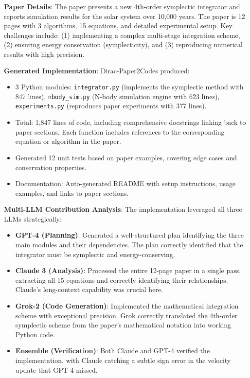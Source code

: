 \documentclass{ieeeaccess}
\begin{document}
\textbf{Paper Details}: The paper presents a new 4th-order symplectic integrator and reports simulation results for the solar system over 10,000 years. The paper is 12 pages with 3 algorithms, 15 equations, and detailed experimental setup. Key challenges include: (1) implementing a complex multi-stage integration scheme, (2) ensuring energy conservation (symplecticity), and (3) reproducing numerical results with high precision.

\textbf{Generated Implementation}: Dirac-Paper2Codes produced:
\begin{itemize}
    \item 3 Python modules: \texttt{integrator.py} (implements the symplectic method with 847 lines), \texttt{nbody\_sim.py} (N-body simulation engine with 623 lines), \texttt{experiments.py} (reproduces paper experiments with 377 lines).
    \item Total: 1,847 lines of code, including comprehensive docstrings linking back to paper sections. Each function includes references to the corresponding equation or algorithm in the paper.
    \item Generated 12 unit tests based on paper examples, covering edge cases and conservation properties.
    \item Documentation: Auto-generated README with setup instructions, usage examples, and links to paper sections.
\end{itemize}

\textbf{Multi-LLM Contribution Analysis}: The implementation leveraged all three LLMs strategically:
\begin{itemize}
    \item \textbf{GPT-4 (Planning)}: Generated a well-structured plan identifying the three main modules and their dependencies. The plan correctly identified that the integrator must be symplectic and energy-conserving.
    \item \textbf{Claude 3 (Analysis)}: Processed the entire 12-page paper in a single pass, extracting all 15 equations and correctly identifying their relationships. Claude's long-context capability was crucial here.
    \item \textbf{Grok-2 (Code Generation)}: Implemented the mathematical integration scheme with exceptional precision. Grok correctly translated the 4th-order symplectic scheme from the paper's mathematical notation into working Python code.
    \item \textbf{Ensemble (Verification)}: Both Claude and GPT-4 verified the implementation, with Claude catching a subtle sign error in the velocity update that GPT-4 missed.
\end{itemize}
\end{document}
